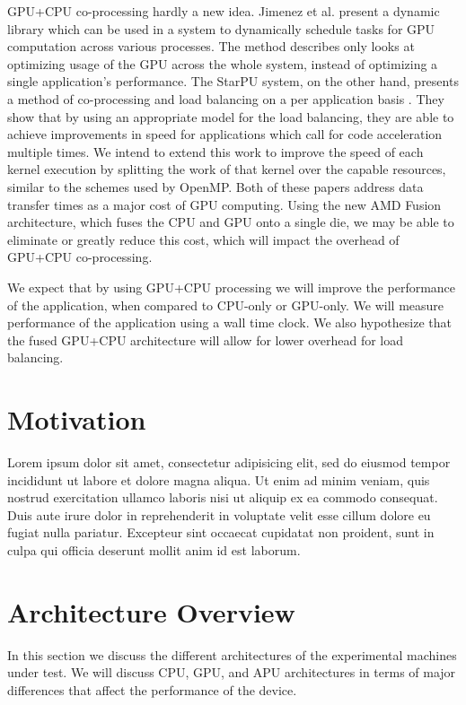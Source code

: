 \documentclass[journal]{IEEEtran}
\begin{document}
GPU+CPU co-processing hardly a new idea.  Jimenez et al. \cite{jimenez} present a
dynamic library which can be used in a system to dynamically schedule tasks for GPU
computation across various processes. The method describes only looks at optimizing
usage of the GPU across the whole system, instead of optimizing a single application’s
performance. The StarPU system, on the other hand, presents a method of co-processing
and load balancing on a per application basis \cite{augonnet}. They show that by using an
appropriate model for the load balancing, they are able to achieve improvements in
speed for applications which call for code acceleration multiple times.  We intend
to extend this work to improve the speed of each kernel execution by splitting the
work of that kernel over the capable resources, similar to the schemes used by OpenMP.
Both of these papers address data transfer times as a major cost of GPU computing.
Using the new AMD Fusion architecture, which fuses the CPU and GPU onto a single die,
we may be able to eliminate or greatly reduce this cost, which will impact the overhead
of GPU+CPU co-processing.

We expect that by using GPU+CPU processing we will improve the performance of the
application, when compared to CPU-only or GPU-only.  We will measure performance of the
application using a wall time clock.  We also hypothesize that the fused GPU+CPU
architecture will allow for lower overhead for load balancing.

\section{Motivation}
Lorem ipsum dolor sit amet, consectetur adipisicing elit, sed do
eiusmod tempor incididunt ut labore et dolore magna aliqua. Ut
enim ad minim veniam, quis nostrud exercitation ullamco laboris
nisi ut aliquip ex ea commodo consequat. Duis aute irure dolor
in reprehenderit in voluptate velit esse cillum dolore eu fugiat
nulla pariatur. Excepteur sint occaecat cupidatat non proident,
sunt in culpa qui officia deserunt mollit anim id est laborum.

\section{Architecture Overview}
In this section we discuss the different architectures of the experimental
machines under test.  We will discuss CPU, GPU, and APU architectures in
terms of major differences that affect the performance of the device.  
\end{document}
